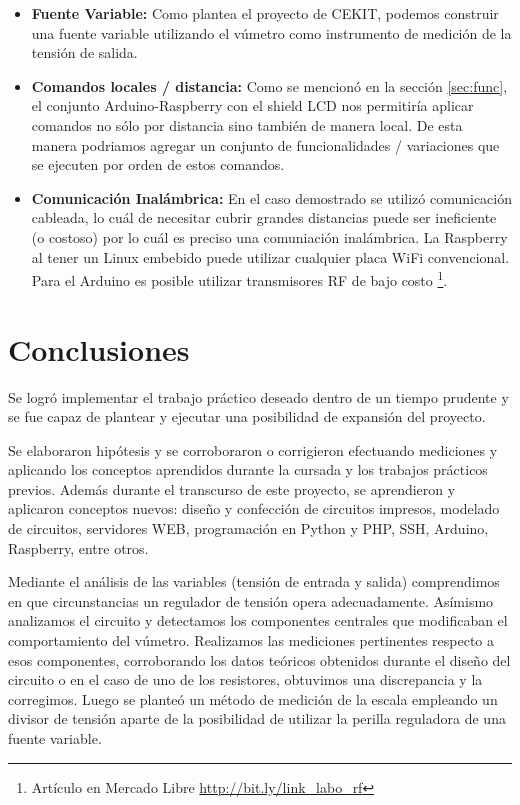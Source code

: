 \documentclass[12pt,a4paper]{article}
\begin{document}
			\begin{itemize}
				\item \textbf{Fuente Variable:} Como plantea el proyecto de CEKIT, podemos construir una fuente variable utilizando el vúmetro como instrumento de medición de la tensión de salida.
				\item \textbf{Comandos locales / distancia:} Como se mencionó en la sección \ref{sec:func}, el conjunto Arduino-Raspberry con el shield LCD nos permitiría aplicar comandos no sólo por distancia sino también de manera local. De esta manera podriamos agregar un conjunto de funcionalidades / variaciones que se ejecuten por orden de estos comandos.
				\item \textbf{Comunicación Inalámbrica:} En el caso demostrado se utilizó comunicación cableada, lo cuál de necesitar cubrir grandes distancias puede ser ineficiente (o costoso) por lo cuál es preciso una comuniación inalámbrica. La Raspberry al tener un Linux embebido puede utilizar cualquier placa WiFi convencional. Para el Arduino es posible utilizar transmisores RF de bajo costo \footnote{Artículo en Mercado Libre \url{http://bit.ly/link_labo_rf}}.
			\end{itemize}


	\newpage
	\section{Conclusiones}

	Se logró implementar el trabajo práctico deseado dentro de un tiempo prudente y se fue capaz de plantear y ejecutar una posibilidad de expansión del proyecto.

	Se elaboraron hipótesis y se corroboraron o corrigieron efectuando mediciones y aplicando los conceptos aprendidos durante la cursada y los trabajos prácticos previos. Además durante el transcurso de este proyecto, se aprendieron y aplicaron conceptos nuevos: diseño y confección de circuitos impresos, modelado de circuitos, servidores WEB, programación en Python y PHP, SSH, Arduino, Raspberry, entre otros. 

	Mediante el análisis de las variables (tensión de entrada y salida) comprendimos en que circunstancias un regulador de tensión opera adecuadamente. Asímismo analizamos el circuito y detectamos los componentes centrales que modificaban el comportamiento del vúmetro. Realizamos las mediciones pertinentes respecto a esos componentes, corroborando los datos teóricos obtenidos durante el diseño del circuito o en el caso de uno de los resistores, obtuvimos una discrepancia y la corregimos. Luego se planteó un método de medición de la escala empleando un divisor de tensión aparte de la posibilidad de utilizar la perilla reguladora de una fuente variable. 
\end{document}
